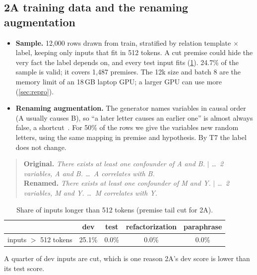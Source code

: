 \documentclass[12pt,a4paper]{article}
\newcommand{\thead}[1]{\textbf{#1}}
\newenvironment{examplebox}{\begin{quote}}{\end{quote}}
\begin{document}
\subsection{2A training data and the renaming augmentation}\label{sec:data2a}
\begin{itemize}
  \item \textbf{Sample.} 12{,}000 rows drawn from train, stratified by relation template $\times$ label, keeping only inputs
        that fit in 512 tokens. A cut premise could hide the very fact the label depends on, and every test input fits
        (\cref{tab:trunc}). 24.7\% of the sample is valid; it covers 1{,}487 premises. The 12k size and batch 8 are the memory
        limit of an 18\,GB laptop GPU; a larger GPU can use more (\cref{sec:repro}).
  \item \textbf{Renaming augmentation.} The generator names variables in causal order (A usually causes B), so ``a later
        letter causes an earlier one'' is almost always false, a shortcut~\cite{geirhos2020}. For 50\% of the rows we give the
        variables new random letters, using the same mapping in premise and hypothesis. By T7 the label does not change.
\end{itemize}

\begin{examplebox}
\small\textbf{Original.} \emph{There exists at least one confounder of A and B.} $\mid$ \emph{\dots\ 2 variables, A and B. \dots\ A correlates with B.}\\
\textbf{Renamed.} \emph{There exists at least one confounder of M and Y.} $\mid$ \emph{\dots\ 2 variables, M and Y. \dots\ M correlates with Y.}
\end{examplebox}

\begin{table}[!htbp]
\centering\small
\caption{Share of inputs longer than 512 tokens (premise tail cut for 2A).}
\label{tab:trunc}
\begin{tabular}{@{}lcccc@{}}
\toprule
& \thead{dev} & \thead{test} & \thead{refactorization} & \thead{paraphrase} \\
\midrule
inputs $>$ 512 tokens & 25.1\% & 0.0\% & 0.0\% & 0.0\% \\
\bottomrule
\end{tabular}
\end{table}

A quarter of dev inputs are cut, which is one reason 2A's dev score is lower than its test score.
\end{document}
